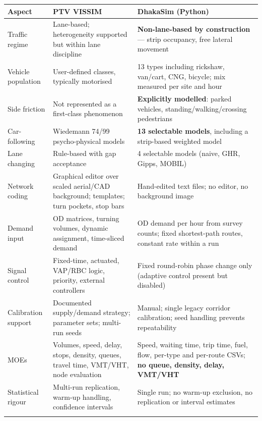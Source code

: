 \documentclass[11pt,a4paper]{article}
\begin{document}
\begin{longtable}{@{}p{}p{}p{}@{}}
\toprule
\textbf{Aspect} & \textbf{PTV VISSIM} & \textbf{DhakaSim (Python)} \\
\midrule
\endhead
Traffic regime &
Lane-based; heterogeneity supported but within lane discipline &
\textbf{Non-lane-based by construction} --- strip occupancy, free lateral movement \\
\addlinespace
Vehicle population &
User-defined classes, typically motorised &
13 types including rickshaw, van/cart, CNG, bicycle; mix measured per site and hour \\
\addlinespace
Side friction &
Not represented as a first-class phenomenon &
\textbf{Explicitly modelled}: parked vehicles, standing/walking/crossing pedestrians \\
\addlinespace
Car-following &
Wiedemann 74/99 psycho-physical models &
\textbf{13 selectable models}, including a strip-based weighted model \\
\addlinespace
Lane changing &
Rule-based with gap acceptance &
4 selectable models (naive, GHR, Gipps, MOBIL) \\
\addlinespace
Network coding &
Graphical editor over scaled aerial/CAD background; templates; turn pockets, stop bars &
Hand-edited text files; no editor, no background image \\
\addlinespace
Demand input &
OD matrices, turning volumes, dynamic assignment, time-sliced demand &
OD demand per hour from survey counts; fixed shortest-path routes, constant rate within a run \\
\addlinespace
Signal control &
Fixed-time, actuated, VAP/RBC logic, priority, external controllers &
Fixed round-robin phase change only (adaptive control present but disabled) \\
\addlinespace
Calibration support &
Documented supply/demand strategy; parameter sets; multi-run seeds &
Manual; single legacy corridor calibration; seed handling prevents repeatability \\
\addlinespace
MOEs &
Volumes, speed, delay, stops, density, queues, travel time, VMT/VHT, node evaluation &
Speed, waiting time, trip time, fuel, flow, per-type and per-route CSVs; \textbf{no queue, density, delay, VMT/VHT} \\
\addlinespace
Statistical rigour &
Multi-run replication, warm-up handling, confidence intervals &
Single run; no warm-up exclusion, no replication or interval estimates \\
\addlinespace

\end{longtable}
\end{document}
